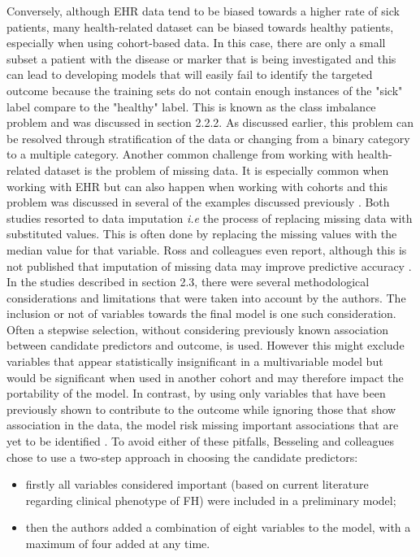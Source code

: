 Conversely, although EHR data tend to be biased towards a higher rate of sick patients, many health-related dataset can be biased towards healthy patients, especially when using cohort-based data. In this case, there are only a small subset a patient with the disease or marker that is being investigated and this can lead to developing models that will easily fail to identify the targeted outcome because the training sets do not contain enough instances of the "sick" label compare to the "healthy" label. This is known as the class imbalance problem and was discussed in section 2.2.2. 
As discussed earlier, this problem can be resolved through stratification of the data or changing from a binary category to a multiple category.
Another common challenge from working with health-related dataset is the problem of missing data. It is especially common when working with EHR \citep{Goldstein:2017bk} but can also happen when working with cohorts and this problem was discussed in several of the examples discussed previously \citep{Besseling:2017bs, Ross:2016kh}.\newline
Both studies resorted to data imputation \textit{i.e} the process of replacing missing data with substituted values. This is often done by replacing the missing values with the median value for that variable. Ross and colleagues even report, although this is not published that imputation of missing data may improve predictive accuracy \citep{Ross:2016kh}.\newline
In the studies described in section 2.3, there were several methodological considerations and limitations that were taken into account by the authors. The inclusion or not of variables towards the final model is one such consideration. Often a stepwise selection, without considering previously known association between candidate predictors and outcome, is used. However this might exclude variables that appear statistically insignificant in a multivariable model but would be significant when used in another cohort and may therefore impact the portability of the model. In contrast, by using only variables that have been previously shown to contribute to the outcome while ignoring those that show association in the data, the model risk missing important associations that are yet to be identified \citep{Besseling:2017bs}. To avoid either of these pitfalls, Besseling and colleagues chose to use a two-step approach in choosing the candidate predictors: 
 \begin{itemize}
 \item firstly all variables considered important (based on current literature regarding clinical phenotype of FH) were included in a preliminary model;
 \item then the authors added a combination of eight variables to the model, with a maximum of four added at any time.
\end{itemize}
